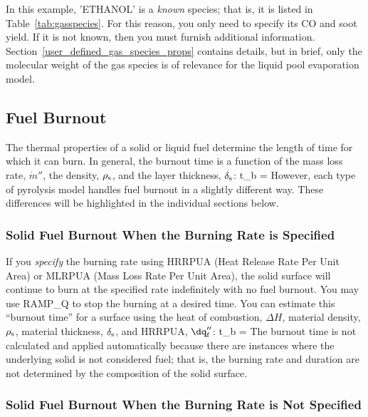 \documentclass[11pt]{book}
\begin{document}
In this example, {\ct 'ETHANOL'} is a {\em known} species; that is, it is listed in Table~\ref{tab:gasspecies}. For this reason, you only need to specify its CO and soot yield. If it is not known, then you must furnish additional information. Section~\ref{user_defined_gas_species_props} contains details, but in brief, only the molecular weight of the gas species is of relevance for the liquid pool evaporation model.


\subsection{Fuel Burnout}

The thermal properties of a solid or liquid fuel determine the length of time for which it can burn. In general, the burnout time is a function of the mass loss rate, $\dot{m}''$, the density, $\rho_{\rm s}$, and the layer thickness, $\delta_{\rm s}$:
\be
   t_{\rm b} = 
\ee
However, each type of pyrolysis model handles fuel burnout in a slightly different way. These differences will be highlighted in the individual sections below.

\subsubsection{Solid Fuel Burnout When the Burning Rate is Specified}

If you {\em specify} the burning rate using {\ct HRRPUA} (Heat Release Rate Per Unit Area) or {\ct MLRPUA} (Mass Loss Rate Per Unit Area), the solid surface will continue to burn at the specified rate indefinitely with no fuel burnout. You may use {\ct RAMP\_Q} to stop the burning at a desired time. You can estimate this ``burnout time'' for a surface using the heat of combustion, $\Delta H$, material density, $\rho_{\rm s}$, material thickness, $\delta_{\rm s}$, and {\ct HRRPUA}, $\dq_{\rm f}''$:
\be
   t_{\rm b} = 
\ee
The burnout time is not calculated and applied automatically because there are instances where the underlying solid is not considered fuel; that is, the burning rate and duration are not determined by the composition of the solid surface.


\subsubsection{Solid Fuel Burnout When the Burning Rate is Not Specified}
\end{document}
